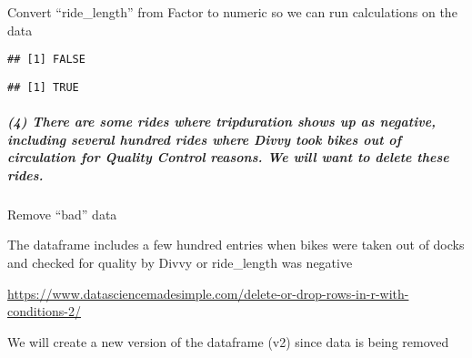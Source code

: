 \documentclass[
]{article}
\newenvironment{Shaded}{\begin{snugshade}}{\end{snugshade}}
\newcommand{\DecValTok}[1]{\textcolor[rgb]{0.00,0.00,0.81}{#1}}
\newcommand{\FunctionTok}[1]{\textcolor[rgb]{0.00,0.00,0.00}{#1}}
\newcommand{\NormalTok}[1]{#1}
\newcommand{\OtherTok}[1]{\textcolor[rgb]{0.56,0.35,0.01}{#1}}
\newcommand{\SpecialCharTok}[1]{\textcolor[rgb]{0.00,0.00,0.00}{#1}}
\newcommand{\StringTok}[1]{\textcolor[rgb]{0.31,0.60,0.02}{#1}}
\begin{document}
Convert ``ride\_length'' from Factor to numeric so we can run
calculations on the data

\begin{Shaded}
\end{Shaded}

\begin{verbatim}
## [1] FALSE
\end{verbatim}

\begin{Shaded}
\end{Shaded}

\begin{verbatim}
## [1] TRUE
\end{verbatim}

\hypertarget{there-are-some-rides-where-tripduration-shows-up-as-negative-including-several-hundred-rides-where-divvy-took-bikes-out-of-circulation-for-quality-control-reasons.-we-will-want-to-delete-these-rides.}{%
\subparagraph{(4) There are some rides where tripduration shows up as
negative, including several hundred rides where Divvy took bikes out of
circulation for Quality Control reasons. We will want to delete these
rides.}\label{there-are-some-rides-where-tripduration-shows-up-as-negative-including-several-hundred-rides-where-divvy-took-bikes-out-of-circulation-for-quality-control-reasons.-we-will-want-to-delete-these-rides.}}

Remove ``bad'' data

The dataframe includes a few hundred entries when bikes were taken out
of docks and checked for quality by Divvy or ride\_length was negative

\url{https://www.datasciencemadesimple.com/delete-or-drop-rows-in-r-with-conditions-2/}

We will create a new version of the dataframe (v2) since data is being
removed

\begin{Shaded}
\end{Shaded}
\end{document}
